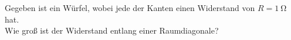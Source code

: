 \begin{Exercise}[label = wdsw, title = Widerstandswürfel , difficulty = 2 ]
	Gegeben ist ein Würfel, wobei jede der Kanten einen Widerstand von $R = 1~\mathrm{\Omega}$ hat.\\
	Wie groß ist der Widerstand entlang einer Raumdiagonale?
\end{Exercise}

